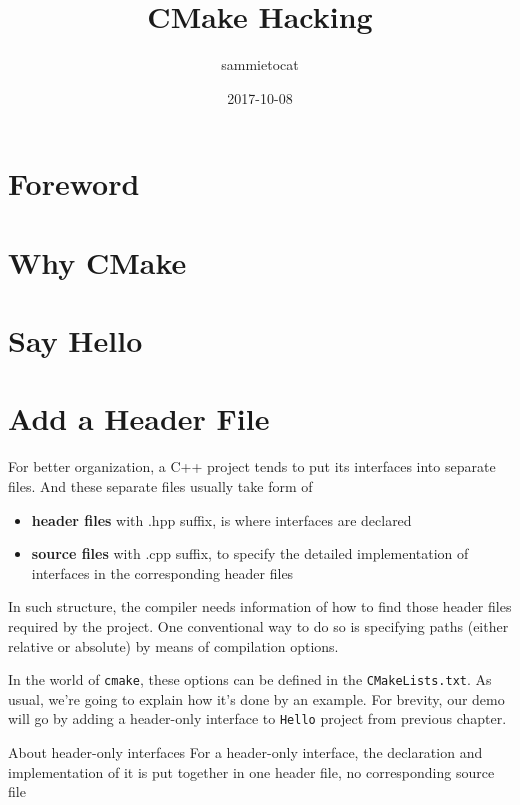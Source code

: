 \documentclass[a4paper,10pt]{book}
\title{CMake Hacking}
\author{sammietocat}
\date{2017-10-08}
\begin{document}
\maketitle
\tableofcontents

\iffalse
\begin{mquote}
  Hello Box
\end{mquote}
\fi

\chapter*{Foreword}

\chapter{Why CMake}

\chapter{Say Hello}

\chapter{Add a Header File}
For better organization, a C++ project tends to put its interfaces into separate files. And these separate files usually take form of 
\begin{itemize}
  \item \textbf{header files} with .hpp suffix, is where interfaces are declared 
  \item \textbf{source files} with .cpp suffix, to specify the detailed implementation of interfaces in the corresponding header files
\end{itemize}
In such structure, the compiler needs information of how to find those header files required by the project. One conventional way to do so is specifying paths (either relative or absolute) by means of compilation options.\par
In the world of \texttt{cmake}, these options can be defined in the \texttt{CMakeLists.txt}. As usual, we're going to explain how it's done by an example. For brevity, our demo will go by adding a header-only interface to \texttt{Hello} project from previous chapter. 
\begin{minfo}{About header-only interfaces}
  For a header-only interface, the declaration and implementation of it is put together in one header file, no corresponding source file
\end{minfo}
\end{document}
